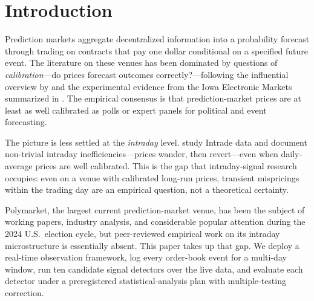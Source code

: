 \documentclass[review,12pt,authoryear]{elsarticle}
\begin{document}
\linenumbers

\section{Introduction}
\label{sec:intro}

Prediction markets aggregate decentralized information into a probability
forecast through trading on contracts that pay one dollar conditional on a
specified future event. The literature on these venues has been dominated
by questions of \emph{calibration}---do prices forecast outcomes
correctly?---following the influential overview by \citet{WolfersZitzewitz2004}
and the experimental evidence from the Iowa Electronic Markets summarized in
\citet{BergForsytheNelsonRietz2008}. The empirical consensus is that
prediction-market prices are at least as well calibrated as polls or expert
panels for political and event forecasting.

The picture is less settled at the \emph{intraday} level. \citet{PageClemen2013}
study Intrade data and document non-trivial intraday inefficiencies---prices
wander, then revert---even when daily-average prices are well calibrated.
This is the gap that intraday-signal research occupies: even on a venue with
calibrated long-run prices, transient mispricings within the trading day are
an empirical question, not a theoretical certainty.

Polymarket, the largest current prediction-market venue, has been the subject
of working papers, industry analysis, and considerable popular attention
during the 2024 U.S.\ election cycle, but peer-reviewed empirical work on its
intraday microstructure is essentially absent. This paper takes up that gap.
We deploy a real-time observation framework, log every order-book event for
a multi-day window, run ten candidate signal detectors over the live data,
and evaluate each detector under a preregistered statistical-analysis plan
with multiple-testing correction.
\end{document}

